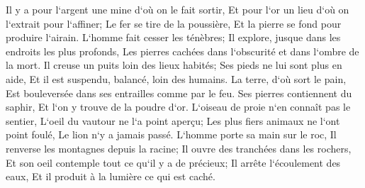\verse Il y a pour l`argent une mine d`où on le fait sortir, Et pour l`or un lieu d`où on l`extrait pour l`affiner; 
\verse Le fer se tire de la poussière, Et la pierre se fond pour produire l`airain. 
\verse L`homme fait cesser les ténèbres; Il explore, jusque dans les endroits les plus profonds, Les pierres cachées dans l`obscurité et dans l`ombre de la mort. 
\verse Il creuse un puits loin des lieux habités; Ses pieds ne lui sont plus en aide, Et il est suspendu, balancé, loin des humains. 
\verse La terre, d`où sort le pain, Est bouleversée dans ses entrailles comme par le feu. 
\verse Ses pierres contiennent du saphir, Et l`on y trouve de la poudre d`or. 
\verse L`oiseau de proie n`en connaît pas le sentier, L`oeil du vautour ne l`a point aperçu; 
\verse Les plus fiers animaux ne l`ont point foulé, Le lion n`y a jamais passé. 
\verse L`homme porte sa main sur le roc, Il renverse les montagnes depuis la racine; 
\verse Il ouvre des tranchées dans les rochers, Et son oeil contemple tout ce qu`il y a de précieux; 
\verse Il arrête l`écoulement des eaux, Et il produit à la lumière ce qui est caché. 
